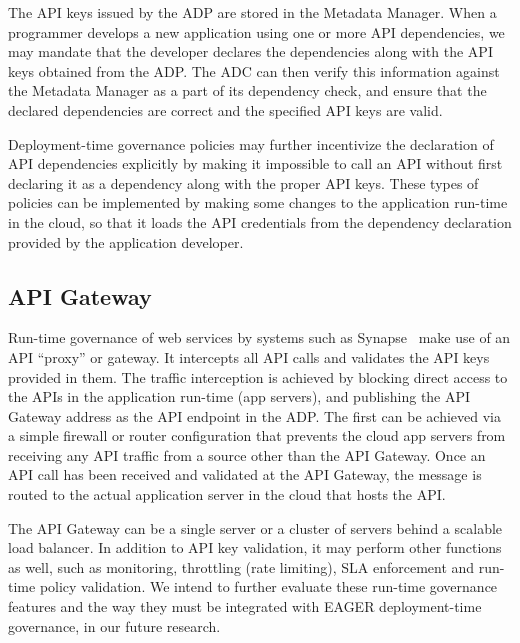 The API keys issued by the ADP are stored in the Metadata Manager. When a
programmer develops a new application using one or more API dependencies, we
may mandate that the developer declares the dependencies along with the API
keys obtained from the ADP. The ADC can then verify this information against
the Metadata Manager as a part of its dependency check, and ensure that the
declared dependencies are correct and the specified API keys are valid. 

Deployment-time governance policies
may further incentivize the declaration of API 
dependencies explicitly by making it 
impossible to call an API without first declaring it as a dependency along
with the proper API keys. These types of policies can be implemented
by making some changes to the
application run-time in the cloud, so that it loads the API credentials from
the dependency declaration provided by the application developer.

\subsection{API Gateway} 
Run-time governance of web services by systems such as
Synapse~\cite{synapse} make use of an API ``proxy'' or gateway.
It
intercepts all API calls and validates the API keys provided in them. The
traffic interception is achieved by blocking direct access to the APIs in the
application run-time (app servers), and publishing the API Gateway address as
the API endpoint in the ADP. The first can be achieved via a simple firewall
or router configuration that prevents the cloud app servers from receiving any
API traffic from a source other than the API Gateway. Once an API call has
been received and validated at the API Gateway, the message is routed to the
actual application server in the cloud that hosts the API.

The API Gateway can be a single server or a cluster of servers 
behind a scalable load balancer. %
In addition to API key validation, it may perform other
functions as well, such as monitoring, throttling (rate limiting), SLA
enforcement and run-time policy validation. We intend to further evaluate these
run-time governance features and the way they must be integrated with
EAGER deployment-time governance,
in our future research.
